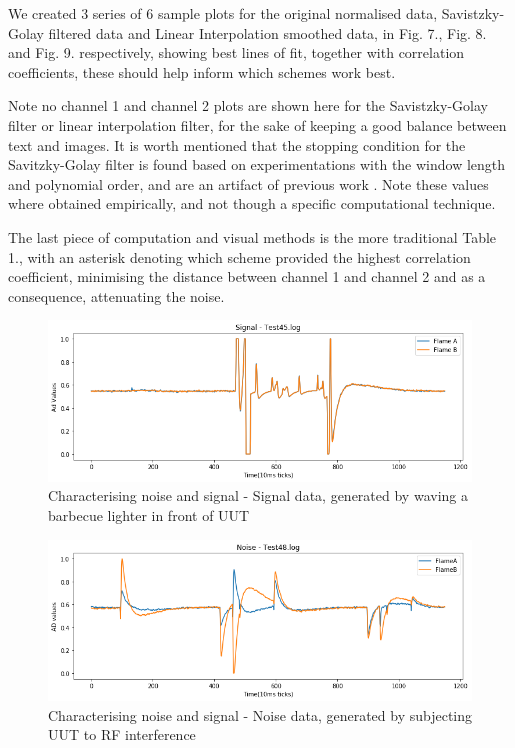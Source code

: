 We created 3 series of 6 sample plots for the original normalised data, Savistzky-Golay filtered data and Linear Interpolation smoothed data, in Fig. 7., Fig. 8. and Fig. 9. respectively, showing best lines of fit, together with correlation coefficients, these should help inform which schemes work best.

Note no channel 1 and channel 2 plots are shown here for the Savistzky-Golay filter or linear interpolation filter, for the sake of keeping a good balance between text and images. It is worth mentioned that the stopping condition for the Savitzky-Golay filter is found based on experimentations with the window length and polynomial order, and are an artifact of previous work \cite{Sikar:INM430}. Note these values where obtained empirically, and not though a specific computational technique.

The last piece of computation and visual methods is the more traditional Table 1., with an asterisk denoting which scheme provided the highest correlation coefficient, minimising the distance between channel 1 and channel 2 and as a consequence, attenuating the noise. 

\begin{figure}[tb]
 \centering %
 \includegraphics[width=\columnwidth]{pictures/05-signal.png}
 \caption{Characterising noise and signal - Signal data, generated by waving a barbecue lighter in front of UUT}
 \label{fig:sample}
\end{figure}



\begin{figure}[tb]
 \centering %
 \includegraphics[width=\columnwidth]{pictures/04-noise.png}
 \caption{Characterising noise and signal - Noise data, generated by subjecting UUT to RF interference}
 \label{fig:sample}
\end{figure}


